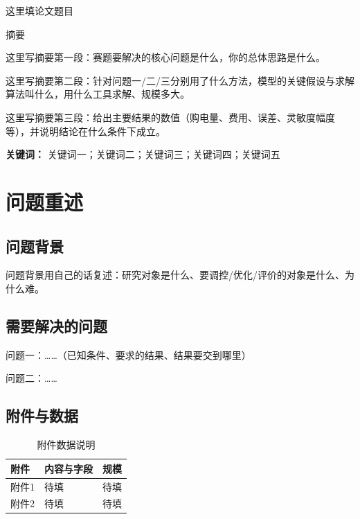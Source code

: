 \documentclass[12pt,a4paper,UTF8]{ctexart}
\begin{document}
\begin{center}
  {\heiti 这里填论文题目}\\[6pt]
\end{center}

\begin{center}
  {\heiti 摘\quad 要}
\end{center}

这里写摘要第一段：赛题要解决的核心问题是什么，你的总体思路是什么。

这里写摘要第二段：针对问题一/二/三分别用了什么方法，模型的关键假设与求解算法叫什么，用什么工具求解、规模多大。

这里写摘要第三段：给出主要结果的数值（购电量、费用、误差、灵敏度幅度等），并说明结论在什么条件下成立。

\begin{flushleft}
  \textbf{关键词：} 关键词一；关键词二；关键词三；关键词四；关键词五
\end{flushleft}

\newpage

\section{问题重述}

\subsection{问题背景}
问题背景用自己的话复述：研究对象是什么、要调控/优化/评价的对象是什么、为什么难。

\subsection{需要解决的问题}
问题一：……（已知条件、要求的结果、结果要交到哪里）

问题二：……

\subsection{附件与数据}
\begin{table}[H]
  \centering
  \caption{附件数据说明}
  \begin{tabularx}{\textwidth}{lXl}
    \toprule
    附件 & 内容与字段 & 规模 \\
    \midrule
    附件1 & 待填 & 待填 \\
    附件2 & 待填 & 待填 \\
    \bottomrule
  \end{tabularx}
\end{table}
\end{document}
